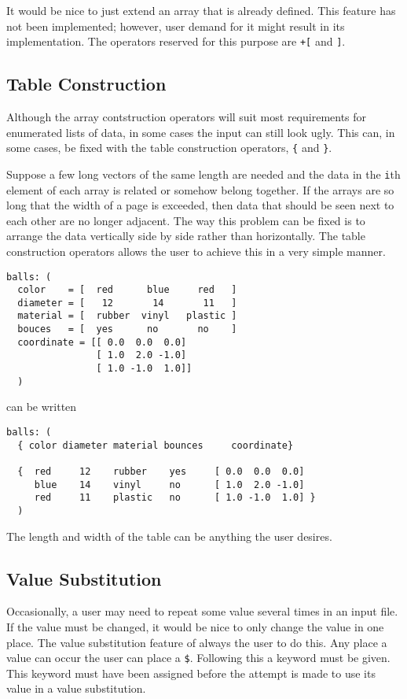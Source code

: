 It would be nice to just extend an array that is already defined.  This
feature has not been implemented; however, user demand for it might
result in its implementation.  The operators reserved for this purpose
are \verb|+[| and \verb|]|.

\subsection{Table Construction}

Although the array contstruction operators will suit most requirements
for enumerated lists of data, in some cases the input can still look
ugly.  This can, in some cases, be fixed with the table construction
operators, \verb|{| and \verb|}|.

Suppose a few long vectors of the same length are needed and the data in
the \verb|i|th element of each array is related or somehow belong
together.  If the arrays are so long that the width of a page is
exceeded, then data that should be seen next to each other are no longer
adjacent.  The way this problem can be fixed is to arrange the data
vertically side by side rather than horizontally.  The table
construction operators allows the user to achieve this in a very simple
manner.
\begin{verbatim}
balls: (
  color    = [  red      blue     red   ]
  diameter = [   12       14       11   ]
  material = [  rubber  vinyl   plastic ]
  bouces   = [  yes      no       no    ]
  coordinate = [[ 0.0  0.0  0.0]
                [ 1.0  2.0 -1.0]
                [ 1.0 -1.0  1.0]]
  )
\end{verbatim}
can be written
\begin{verbatim}
balls: (
  { color diameter material bounces     coordinate}
                  
  {  red     12    rubber    yes     [ 0.0  0.0  0.0]
     blue    14    vinyl     no      [ 1.0  2.0 -1.0]
     red     11    plastic   no      [ 1.0 -1.0  1.0] }
  )
\end{verbatim}
The length and width of the table can be anything the user desires.

\subsection{Value Substitution}
\label{ParsedKeyVal:valsub}

Occasionally, a user may need to repeat some value several times in an
input file.  If the value must be changed, it would be nice to only
change the value in one place.  The value substitution feature of
 always the user to do this.  Any place a value can
occur the user can place a \verb|$|.  Following this a keyword must be
given.  This keyword must have been assigned before the attempt is made
to use its value in a value substitution.

